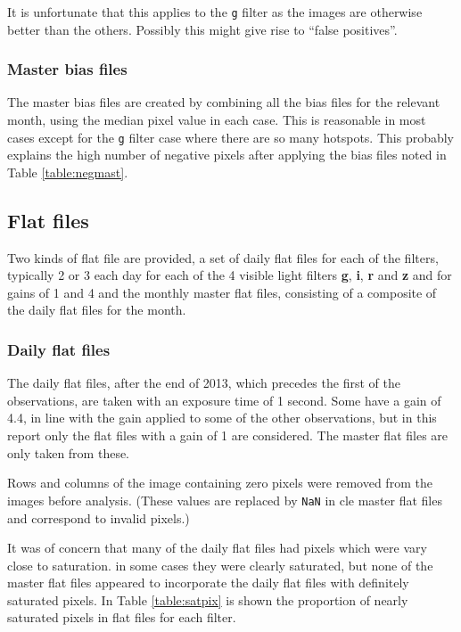 It is unfortunate that this applies to the \texttt{g} filter as the images are
otherwise better than the others. Possibly this might give rise to ``false
positives''.

\subsubsection{Master bias files}
\protect\label{section:masterbias}

The master bias files are created by combining all the bias files for the
relevant month, using the median pixel value in each case. This is reasonable
in most cases except for the \texttt{g} filter case where there are so many
hotspots. This probably explains the high number of negative pixels after
applying the bias files noted in Table \ref{table:negmast}.


\subsection{Flat files}
\protect\label{section:flatfiles}

Two kinds of flat file are provided, a set of daily flat files for each of the
filters, typically 2 or 3 each day for each of the 4 visible light filters \textbf{g},
\textbf{i}, \textbf{r} and \textbf{z} and for gains of 1 and 4 and the monthly
master flat files, consisting of a composite of the daily flat files for the
month.

\subsubsection{Daily flat files}
\protect\label{section:dailyflatfiles}

The daily flat files, after the end of 2013, which precedes the first of the
observations, are taken with an exposure time of 1 second. Some have a gain of
4.4, in line with the gain applied to some of the other observations, but in
this report only the flat files with a gain of 1 are considered. The master flat
files are only taken from these.

Rows and columns of the image containing zero pixels were removed from the
images before analysis. (These values are replaced by \texttt{NaN} in cle master
flat files and correspond to invalid pixels.)

It was of concern that many of the daily flat files had pixels which were vary
close to saturation. in some cases they were clearly saturated, but none of the
master flat files appeared to incorporate the daily flat files with definitely
saturated pixels. In Table \ref{table:satpix} is shown the proportion of
nearly saturated pixels in flat files for each filter.

